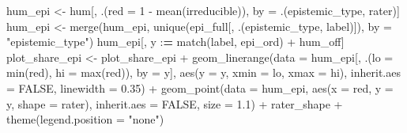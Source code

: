 \documentclass[
  11pt,
]{article}
\newenvironment{Shaded}{\begin{snugshade}}{\end{snugshade}}
\newcommand{\AttributeTok}[1]{\textcolor[rgb]{0.77,0.63,0.00}{#1}}
\newcommand{\ConstantTok}[1]{\textcolor[rgb]{0.00,0.00,0.00}{#1}}
\newcommand{\DecValTok}[1]{\textcolor[rgb]{0.00,0.00,0.81}{#1}}
\newcommand{\ErrorTok}[1]{\textcolor[rgb]{0.64,0.00,0.00}{\textbf{#1}}}
\newcommand{\FloatTok}[1]{\textcolor[rgb]{0.00,0.00,0.81}{#1}}
\newcommand{\FunctionTok}[1]{\textcolor[rgb]{0.00,0.00,0.00}{#1}}
\newcommand{\NormalTok}[1]{#1}
\newcommand{\OtherTok}[1]{\textcolor[rgb]{0.56,0.35,0.01}{#1}}
\newcommand{\SpecialCharTok}[1]{\textcolor[rgb]{0.00,0.00,0.00}{#1}}
\newcommand{\StringTok}[1]{\textcolor[rgb]{0.31,0.60,0.02}{#1}}
\begin{document}
\begin{Shaded}
\begin{Highlighting}[]
\NormalTok{hum\_epi }\OtherTok{\textless{}{-}}\NormalTok{ hum[, .(}\AttributeTok{red =} \DecValTok{1} \SpecialCharTok{{-}} \FunctionTok{mean}\NormalTok{(irreducible)), by }\OtherTok{=}\NormalTok{ .(epistemic\_type, rater)]}
\NormalTok{hum\_epi }\OtherTok{\textless{}{-}} \FunctionTok{merge}\NormalTok{(hum\_epi, }\FunctionTok{unique}\NormalTok{(epi\_full[, .(epistemic\_type, label)]),}
                 \AttributeTok{by =} \StringTok{"epistemic\_type"}\NormalTok{)}
\NormalTok{hum\_epi[, y }\SpecialCharTok{:}\ErrorTok{=} \FunctionTok{match}\NormalTok{(label, epi\_ord) }\SpecialCharTok{+}\NormalTok{ hum\_off]}
\NormalTok{plot\_share\_epi }\OtherTok{\textless{}{-}}\NormalTok{ plot\_share\_epi }\SpecialCharTok{+}
  \FunctionTok{geom\_linerange}\NormalTok{(}\AttributeTok{data =}\NormalTok{ hum\_epi[, .(}\AttributeTok{lo =} \FunctionTok{min}\NormalTok{(red), }\AttributeTok{hi =} \FunctionTok{max}\NormalTok{(red)), }\AttributeTok{by =}\NormalTok{ y],}
                 \FunctionTok{aes}\NormalTok{(}\AttributeTok{y =}\NormalTok{ y, }\AttributeTok{xmin =}\NormalTok{ lo, }\AttributeTok{xmax =}\NormalTok{ hi), }\AttributeTok{inherit.aes =} \ConstantTok{FALSE}\NormalTok{,}
                 \AttributeTok{linewidth =} \FloatTok{0.35}\NormalTok{) }\SpecialCharTok{+}
  \FunctionTok{geom\_point}\NormalTok{(}\AttributeTok{data =}\NormalTok{ hum\_epi, }\FunctionTok{aes}\NormalTok{(}\AttributeTok{x =}\NormalTok{ red, }\AttributeTok{y =}\NormalTok{ y, }\AttributeTok{shape =}\NormalTok{ rater),}
             \AttributeTok{inherit.aes =} \ConstantTok{FALSE}\NormalTok{, }\AttributeTok{size =} \FloatTok{1.1}\NormalTok{) }\SpecialCharTok{+}
\NormalTok{  rater\_shape }\SpecialCharTok{+}
  \FunctionTok{theme}\NormalTok{(}\AttributeTok{legend.position =} \StringTok{"none"}\NormalTok{)}
\end{Highlighting}
\end{Shaded}
\end{document}
